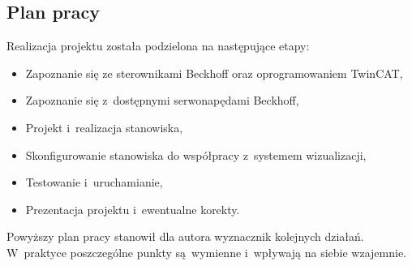 \subsection{Plan pracy}
Realizacja projektu została podzielona na następujące etapy:
\begin{itemize}
\item Zapoznanie się ze sterownikami Beckhoff oraz oprogramowaniem TwinCAT,
\item Zapoznanie się z~dostępnymi serwonapędami Beckhoff,
\item Projekt i~realizacja stanowiska,
\item Skonfigurowanie stanowiska do współpracy z~systemem wizualizacji,
\item Testowanie i~uruchamianie,
\item Prezentacja projektu i~ewentualne korekty.
\end{itemize}
\indent
\indent Powyższy plan pracy stanowił dla autora wyznacznik kolejnych działań. W~praktyce poszczególne punkty są~wymienne i~wpływają na siebie wzajemnie.